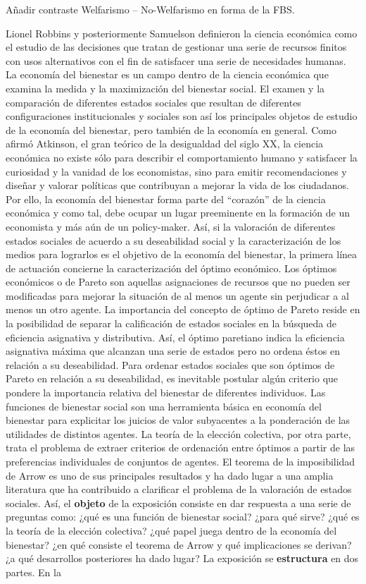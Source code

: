 \documentclass{nuevotema}
\begin{document}
\ideaclave

Añadir contraste Welfarismo -- No-Welfarismo en forma de la FBS.

Lionel Robbins y posteriormente Samuelson definieron la ciencia económica como el estudio de las decisiones que tratan de gestionar una serie de recursos finitos con usos alternativos con el fin de satisfacer una serie de necesidades humanas. La economía del bienestar es un campo dentro de la ciencia económica que examina la medida y la maximización del bienestar social. El examen y la comparación de diferentes estados sociales que resultan de diferentes configuraciones institucionales y sociales son así los principales objetos de estudio de la economía del bienestar, pero también de la economía en general. Como afirmó Atkinson, el gran teórico de la desigualdad del siglo XX, la ciencia económica no existe sólo para describir el comportamiento humano y satisfacer la curiosidad y la vanidad de los economistas, sino para emitir recomendaciones y diseñar y valorar políticas que contribuyan a mejorar la vida de los ciudadanos. Por ello, la economía del bienestar forma parte del ``corazón'' de la ciencia económica y como tal, debe ocupar un lugar preeminente en la formación de un economista y más aún de un policy-maker. Así, si la valoración de diferentes estados sociales de acuerdo a su deseabilidad social y la caracterización de los medios para lograrlos es el objetivo de la economía del bienestar, la primera línea de actuación concierne la caracterización del óptimo económico. Los óptimos económicos o de Pareto son aquellas asignaciones de recursos que no pueden ser modificadas para mejorar la situación de al menos un agente sin perjudicar a al menos un otro agente. La importancia del concepto de óptimo de Pareto reside en la posibilidad de separar la calificación de estados sociales en la búsqueda de eficiencia asignativa y distributiva. Así, el óptimo paretiano indica la eficiencia asignativa máxima que alcanzan una serie de estados pero no ordena éstos en relación a su deseabilidad. Para ordenar estados sociales que son óptimos de Pareto en relación a su deseabilidad, es inevitable postular algún criterio que pondere la importancia relativa del bienestar de diferentes individuos. Las funciones de bienestar social son una herramienta básica en economía del bienestar para explicitar los juicios de valor subyacentes a la ponderación de las utilidades de distintos agentes. La teoría de la elección colectiva, por otra parte, trata el problema de extraer criterios de ordenación entre óptimos a partir de las preferencias individuales de conjuntos de agentes. El teorema de la imposibilidad de Arrow es uno de sus principales resultados y ha dado lugar a una amplia literatura que ha contribuido a clarificar el problema de la valoración de estados sociales. Así, el \textbf{objeto} de la exposición consiste en dar respuesta a una serie de preguntas como: ¿qué es una función de bienestar social? ¿para qué sirve? ¿qué es la teoría de la elección colectiva? ¿qué papel juega dentro de la economía del bienestar? ¿en qué consiste el teorema de Arrow y qué implicaciones se derivan? ¿a qué desarrollos posteriores ha dado lugar? La exposición se \textbf{estructura} en dos partes. En la 
\end{document}
